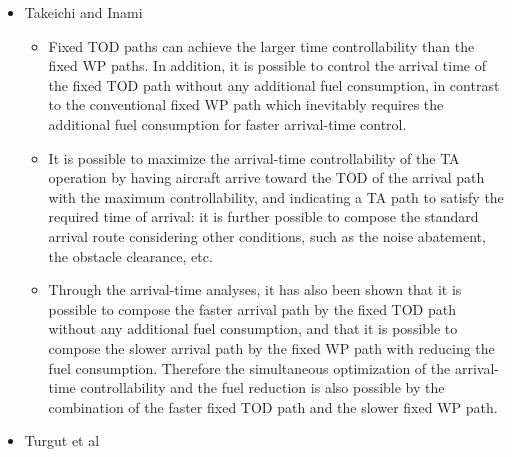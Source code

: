 \documentclass{aer1315-pretty}
\begin{document}
\begin{itemize}
\item Takeichi and Inami \cite{Takeichi:2010}
\begin{itemize}
\item Fixed TOD paths can achieve the larger time controllability than the ﬁxed WP paths. In addition, it is possible to control the arrival time of the ﬁxed TOD
path without any additional fuel consumption, in contrast to the conventional ﬁxed WP path which inevitably requires the additional fuel consumption for faster arrival-time control.
\item It is possible to maximize the arrival-time controllability of the TA operation by having aircraft arrive toward the TOD of the arrival path with the maximum controllability, and indicating a TA path to satisfy the required time of arrival: it is further possible to compose the standard arrival route considering other conditions, such as the noise abatement, the obstacle clearance, etc. 
\item Through the arrival-time analyses, it has also been shown that it is possible to compose the faster arrival path by the ﬁxed TOD path without any additional fuel consumption, and that it is possible to compose the slower arrival path by the ﬁxed WP path with reducing the fuel consumption. Therefore the simultaneous optimization of the arrival-time controllability and the fuel reduction is also possible by the combination of the faster ﬁxed TOD path and the slower ﬁxed WP path.
\end{itemize}


\item Turgut et al \cite{Enis:2010}


\end{itemize}
\end{document}
